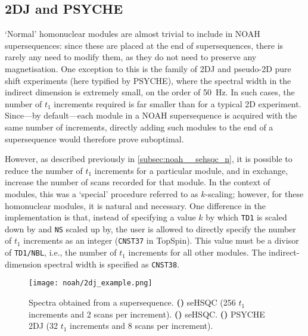 \subsection{2DJ and PSYCHE}
\label{subsec:noah__2djpsyche}

`Normal' homonuclear modules are almost trivial to include in NOAH supersequences: since these are placed at the end of supersequences, there is rarely any need to modify them, as they do not need to preserve any magnetisation.
One exception to this is the family of 2DJ and pseudo-2D pure shift experiments (here typified by PSYCHE), where the spectral width in the indirect dimension is extremely small, on the order of \qty{50}{\Hz}.
In such cases, the number of $t_1$ increments required is far smaller than for a typical 2D experiment.
Since---by default---each module in a NOAH supersequence is acquired with the same number of increments, directly adding such modules to the end of a supersequence would therefore prove suboptimal.

However, as described previously in \cref{subsec:noah__sehsqc_n}, it is possible to reduce the number of $t_1$ increments for a particular module, and in exchange, increase the number of scans recorded for that module.
In the context of \nitrogen{} modules, this was a `special' procedure referred to as $k$-scaling; however, for these homonuclear modules, it is natural and necessary.
One difference in the implementation is that, instead of specifying a value $k$ by which \texttt{TD1} is scaled down by and \texttt{NS} scaled up by, the user is allowed to directly specify the number of $t_1$ increments as an integer (\texttt{CNST37} in TopSpin).
This value must be a divisor of \texttt{TD1/NBL}, i.e., the number of $t_1$ increments for all other modules.
The indirect-dimension spectral width is specified as \texttt{CNST38}.

\begin{figure}[!ht]
    \centering
    \texttt{[image: noah/2dj\_example.png]}%
    {\label{fig:2dj_example_spn}}%
    {\label{fig:2dj_example_spc}}%
    {\label{fig:2dj_example_j}}%
    \caption[Spectra from a  supersequence]{
        Spectra obtained from a  supersequence.
        \textbf{()} \nitrogen{} seHSQC (256 $t_1$ increments and 2 scans per increment).
        \textbf{()} \carbon{} seHSQC.
        \textbf{()} PSYCHE 2DJ (32 $t_1$ increments and 8 scans per increment).
    }
    \label{fig:2dj_example}
\end{figure}

